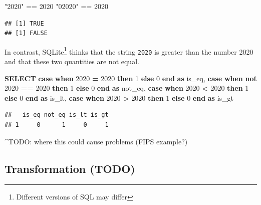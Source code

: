 \documentclass[
]{krantz}
\makeatletter
\newenvironment{Shaded}{\begin{snugshade}}{\end{snugshade}}
\newcommand{\ControlFlowTok}[1]{\textcolor[rgb]{0.27,0.27,0.27}{\textbf{#1}}}
\newcommand{\DecValTok}[1]{\textcolor[rgb]{0.06,0.06,0.06}{#1}}
\newcommand{\KeywordTok}[1]{\textcolor[rgb]{0.27,0.27,0.27}{\textbf{#1}}}
\newcommand{\NormalTok}[1]{#1}
\newcommand{\OperatorTok}[1]{\textcolor[rgb]{0.43,0.43,0.43}{\textbf{#1}}}
\newcommand{\SpecialCharTok}[1]{\textcolor[rgb]{0,0,0}{#1}}
\newcommand{\StringTok}[1]{\textcolor[rgb]{0.5,0.5,0.5}{#1}}
\newenvironment{kframe}{%
\medskip{}
\setlength{\fboxsep}{.8em}
 \def\at@end@of@kframe{}%
 \ifinner\ifhmode%
  \def\at@end@of@kframe{\end{minipage}}%
  \begin{minipage}{\columnwidth}%
 \fi\fi%
 \def\FrameCommand##1{\hskip\@totalleftmargin \hskip-\fboxsep
 \colorbox{shadecolor}{##1}\hskip-\fboxsep
     \hskip-\linewidth \hskip-\@totalleftmargin \hskip\columnwidth}%
 \MakeFramed {\advance\hsize-\width
   \@totalleftmargin\z@ \linewidth\hsize
   \@setminipage}}%
 {\par\unskip\endMakeFramed%
 \at@end@of@kframe}
\renewenvironment{Shaded}{\begin{kframe}}{\end{kframe}}
\makeatother
\begin{document}
\begin{Shaded}
\begin{Highlighting}[]
\StringTok{"2020"} \SpecialCharTok{==} \DecValTok{2020}
\StringTok{"02020"} \SpecialCharTok{==} \DecValTok{2020}
\end{Highlighting}
\end{Shaded}

\begin{verbatim}
## [1] TRUE
## [1] FALSE
\end{verbatim}

In contrast, SQLite\footnote{Different versions of SQL may differ} thinks that the string \texttt{\textquotesingle{}2020\textquotesingle{}} is greater than the number 2020 and that these two quantities are not equal.

\begin{Shaded}
\begin{Highlighting}[]
\KeywordTok{SELECT}
  \ControlFlowTok{case} \ControlFlowTok{when}     \StringTok{\textquotesingle{}2020\textquotesingle{}} \OperatorTok{=}  \DecValTok{2020} \ControlFlowTok{then} \DecValTok{1} \ControlFlowTok{else} \DecValTok{0} \ControlFlowTok{end} \KeywordTok{as}\NormalTok{ is\_eq,}
  \ControlFlowTok{case} \ControlFlowTok{when} \KeywordTok{not} \StringTok{\textquotesingle{}2020\textquotesingle{}} \OperatorTok{==} \DecValTok{2020} \ControlFlowTok{then} \DecValTok{1} \ControlFlowTok{else} \DecValTok{0} \ControlFlowTok{end} \KeywordTok{as}\NormalTok{ not\_eq,}
  \ControlFlowTok{case} \ControlFlowTok{when}     \StringTok{\textquotesingle{}2020\textquotesingle{}} \OperatorTok{\textless{}}  \DecValTok{2020} \ControlFlowTok{then} \DecValTok{1} \ControlFlowTok{else} \DecValTok{0} \ControlFlowTok{end} \KeywordTok{as}\NormalTok{ is\_lt,}
  \ControlFlowTok{case} \ControlFlowTok{when}     \StringTok{\textquotesingle{}2020\textquotesingle{}} \OperatorTok{\textgreater{}}  \DecValTok{2020} \ControlFlowTok{then} \DecValTok{1} \ControlFlowTok{else} \DecValTok{0} \ControlFlowTok{end} \KeywordTok{as}\NormalTok{ is\_gt}
\end{Highlighting}
\end{Shaded}

\begin{verbatim}
##   is_eq not_eq is_lt is_gt
## 1     0      1     0     1
\end{verbatim}

\^{}TODO: where this could cause problems (FIPS example?)

\hypertarget{transformation-todo}{%
\subsection{Transformation (TODO)}\label{transformation-todo}}
\end{document}
